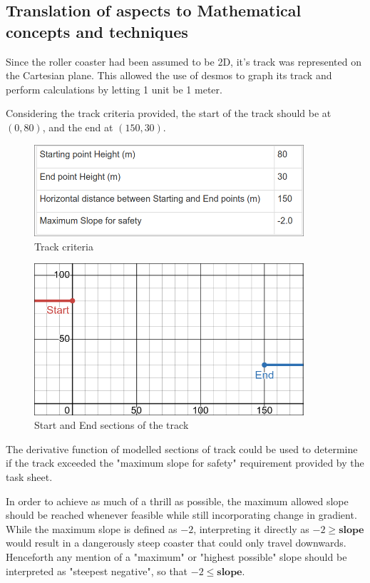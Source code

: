 \documentclass[10pt, letterpaper]{article}
\begin{document}
\subsection{Translation of aspects to Mathematical concepts and techniques}

Since the roller coaster had been assumed to be 2D, it's track was represented on the Cartesian plane. This allowed the use of desmos to graph its track and perform calculations by letting 1 unit be 1 meter. 

Considering the track criteria provided, the start of the track should be at $(0, 80)$, and the end at $(150, 30)$.

\begin{figure}[h]
	\centering
	\includegraphics[width=10cm, trim=4 4 2 2,clip]{trackdefined.png}
	\caption{Track criteria}
\end{figure}
		\begin{figure}[h]
	
	\begin{center}
		\includegraphics[width=10cm]{Start and End.png}
		
		\caption{Start and 
			End sections of the track}
	\end{center}
	
	
\end{figure}

The derivative function of modelled sections of track could be used to determine if the track exceeded the "maximum slope for safety" requirement provided by the task sheet.


In order to achieve as much of a thrill as possible, the maximum allowed slope should be reached whenever feasible while still incorporating change in gradient.
While the maximum slope is defined as $-2$, interpreting it directly as $-2\geq \textbf{slope}$ would result in a dangerously steep coaster that could only travel downwards. Henceforth any mention of a "maximum" or "highest possible" slope should be interpreted as "steepest negative", so that $-2\leq \textbf{slope}$.
\end{document}
